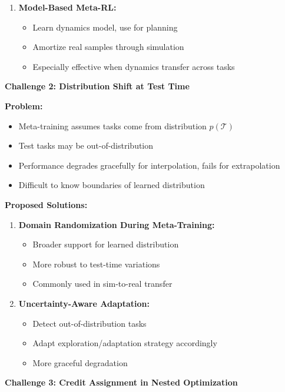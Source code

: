 \documentclass[12pt]{article}
\begin{document}
{{\begin{enumerate}
				\item \textbf{Model-Based Meta-RL:}
				\begin{itemize}
					\item Learn dynamics model, use for planning
					\item Amortize real samples through simulation
					\item Especially effective when dynamics transfer across tasks
				\end{itemize}
			\end{enumerate}
			
			\textbf{Challenge 2: Distribution Shift at Test Time}
			
			\textbf{Problem:}
			\begin{itemize}
				\item Meta-training assumes tasks come from distribution $p(\mathcal{T})$
				\item Test tasks may be out-of-distribution
				\item Performance degrades gracefully for interpolation, fails for extrapolation
				\item Difficult to know boundaries of learned distribution
			\end{itemize}
			
			\textbf{Proposed Solutions:}
			\begin{enumerate}
				\item \textbf{Domain Randomization During Meta-Training:}
				\begin{itemize}
					\item Broader support for learned distribution
					\item More robust to test-time variations
					\item Commonly used in sim-to-real transfer
				\end{itemize}
				
				\item \textbf{Uncertainty-Aware Adaptation:}
				\begin{itemize}
					\item Detect out-of-distribution tasks
					\item Adapt exploration/adaptation strategy accordingly
					\item More graceful degradation
				\end{itemize}
			\end{enumerate}
			
			\textbf{Challenge 3: Credit Assignment in Nested Optimization}
			
}}
\end{document}

